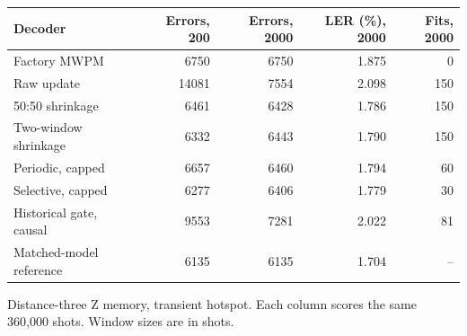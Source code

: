 \begin{center}\small
\begin{tabular}{lrrrr}
\hline
Decoder & Errors, 200 & Errors, 2000 & LER (\%), 2000 & Fits, 2000 \\
\hline
Factory MWPM & 6750 & 6750 & 1.875 & 0 \\
Raw update & 14081 & 7554 & 2.098 & 150 \\
50:50 shrinkage & 6461 & 6428 & 1.786 & 150 \\
Two-window shrinkage & 6332 & 6443 & 1.790 & 150 \\
Periodic, capped & 6657 & 6460 & 1.794 & 60 \\
Selective, capped & 6277 & 6406 & 1.779 & 30 \\
Historical gate, causal & 9553 & 7281 & 2.022 & 81 \\
Matched-model reference & 6135 & 6135 & 1.704 & -- \\
\hline\end{tabular}
\par\smallskip\parbox{0.93\linewidth}{\small Distance-three Z memory, transient hotspot. Each column scores the same 360,000 shots. Window sizes are in shots.}
\end{center}
